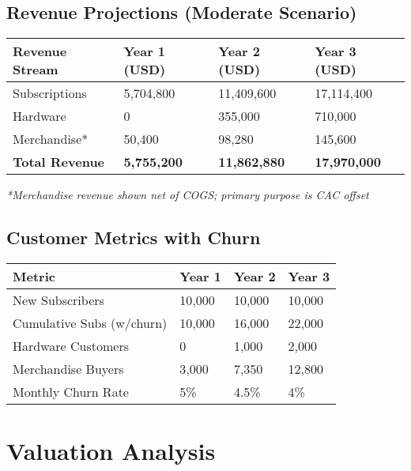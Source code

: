 \documentclass[11pt]{article}
\begin{document}
\subsection{Revenue Projections (Moderate Scenario)}
\begin{table}[htbp]
\centering
\begin{tabularx}{\linewidth}{l Y Y Y}
\toprule
Revenue Stream & Year 1 (USD) & Year 2 (USD) & Year 3 (USD) \\\midrule
Subscriptions & 5,704,800 & 11,409,600 & 17,114,400 \\
Hardware & 0 & 355,000 & 710,000 \\
Merchandise* & 50,400 & 98,280 & 145,600 \\\midrule
\textbf{Total Revenue} & \textbf{5,755,200} & \textbf{11,862,880} & \textbf{17,970,000} \\
\bottomrule
\end{tabularx}
\end{table}
\textit{*Merchandise revenue shown net of COGS; primary purpose is CAC offset}

\subsection{Customer Metrics with Churn}
\begin{table}[htbp]
\centering
\begin{tabularx}{\linewidth}{l Y Y Y}
\toprule
Metric & Year 1 & Year 2 & Year 3 \\\midrule
New Subscribers & 10,000 & 10,000 & 10,000 \\
Cumulative Subs (w/churn) & 10,000 & 16,000 & 22,000 \\
Hardware Customers & 0 & 1,000 & 2,000 \\
Merchandise Buyers & 3,000 & 7,350 & 12,800 \\
Monthly Churn Rate & 5\% & 4.5\% & 4\% \\
\bottomrule
\end{tabularx}
\end{table}

\section{Valuation Analysis}
\end{document}
